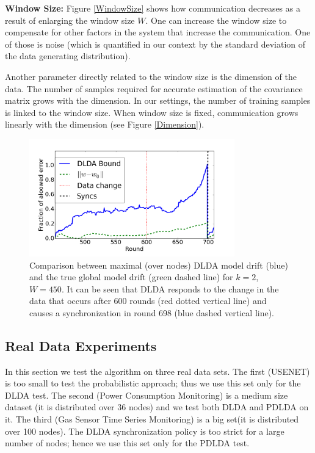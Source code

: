 \documentclass{vldb}
\begin{document}
\noindent\textbf{Window Size:}
Figure \ref{WindowSize} shows how communication decreases as a result
of enlarging the window size $W$.  One can increase the window size to compensate for other factors in the system that increase the communication. One of those is
noise (which is quantified in our context by the standard deviation of the
data generating distribution).


Another parameter directly related to the window size is the dimension of the data. The number of samples required for accurate estimation of the covariance matrix grows with the dimension. In our settings, the number of training samples is linked to the window size. When window size is fixed, communication grows linearly with the dimension (see Figure \ref{Dimension}).



\begin{figure}
	\centering
	\includegraphics[width=3.5in,height=2in]{graphics/DriftDetected.png}
	\caption{Comparison between maximal (over nodes) DLDA model drift (blue)
	and the true global model drift (green dashed line) for $k=2$, $W=450$.
	It can be seen that DLDA responds to the change in the data that occurs
	after 600 rounds (red dotted vertical line) and causes a synchronization in round 698 (blue dashed vertical line).}
	\label{usenet}
	\end{figure}
\subsection{Real Data Experiments}
In this section we test the algorithm on three real data sets. The first
(USENET) is too small to test the probabilistic approach; thus we use this set only for the DLDA test.
The second (Power Consumption Monitoring) is a medium size dataset (it
is distributed over 36 nodes) and we test both DLDA and PDLDA on it.
The third (Gas Sensor Time Series Monitoring) is a big set(it is distributed over
100 nodes). The DLDA synchronization policy is too strict for a large number of nodes; hence we use this set only for the PDLDA test.
\end{document}
